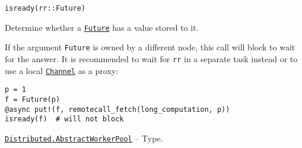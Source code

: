 \begin{adjustwidth}{2em}{0pt}


\begin{verbatim}
isready(rr::Future)
\end{verbatim}

Determine whether a \hyperlink{4170271048165085864}{\texttt{Future}} has a value stored to it.

If the argument \texttt{Future} is owned by a different node, this call will block to wait for the answer. It is recommended to wait for \texttt{rr} in a separate task instead or to use a local \hyperlink{12548845729684045604}{\texttt{Channel}} as a proxy:


\begin{verbatim}
p = 1
f = Future(p)
@async put!(f, remotecall_fetch(long_computation, p))
isready(f)  # will not block
\end{verbatim}



\end{adjustwidth}
\hypertarget{3164386881139700111}{} 
\hyperlink{3164386881139700111}{\texttt{Distributed.AbstractWorkerPool}}  -- {Type.}

